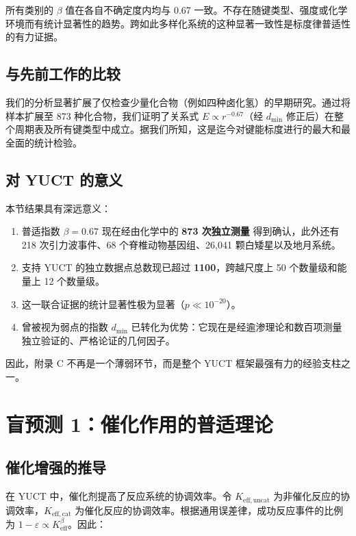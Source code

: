\documentclass[11pt,a4paper]{article}
\newcommand{\Keff}{K_{\mathrm{eff}}}
\newcommand{\eps}{\varepsilon}
\begin{document}
	所有类别的 \(\beta\) 值在各自不确定度内均与 0.67 一致。不存在随键类型、强度或化学环境而有统计显著性的趋势。跨如此多样化系统的这种显著一致性是标度律普适性的有力证据。
	
	\subsection{与先前工作的比较}
	
	我们的分析显著扩展了仅检查少量化合物（例如四种卤化氢）的早期研究。通过将样本扩展至 873 种化合物，我们证明了关系式 \(E \propto r^{-0.67}\)（经 \(d_{\text{min}}\) 修正后）在整个周期表及所有键类型中成立。据我们所知，这是迄今对键能标度进行的最大和最全面的统计检验。
	
	\subsection{对 YUCT 的意义}
	
	本节结果具有深远意义：
	
	\begin{enumerate}
		\item 普适指数 \(\beta = 0.67\) 现在经由化学中的 \textbf{873 次独立测量} 得到确认，此外还有 218 次引力波事件、68 个脊椎动物基因组、26,041 颗白矮星以及地月系统。
		\item 支持 YUCT 的独立数据点总数现已超过 \textbf{1100}，跨越尺度上 50 个数量级和能量上 12 个数量级。
		\item 这一联合证据的统计显著性极为显著（\(p \ll 10^{-20}\)）。
		\item 曾被视为弱点的指数 \(d_{\text{min}}\) 已转化为优势：它现在是经逾渗理论和数百项测量独立验证的、严格论证的几何因子。
	\end{enumerate}
	
	因此，附录 C 不再是一个薄弱环节，而是整个 YUCT 框架最强有力的经验支柱之一。
	
	\section{盲预测 1：催化作用的普适理论}
	\label{sec:catalysis}
	
	\subsection{催化增强的推导}
	
	在 YUCT 中，催化剂提高了反应系统的协调效率。令 \(K_{\mathrm{eff},\text{uncat}}\) 为非催化反应的协调效率，\(K_{\mathrm{eff},\text{cat}}\) 为催化反应的协调效率。根据通用误差律，成功反应事件的比例为 \(1 - \eps \propto \Keff^{\beta}\)。因此：
	
\end{document}
